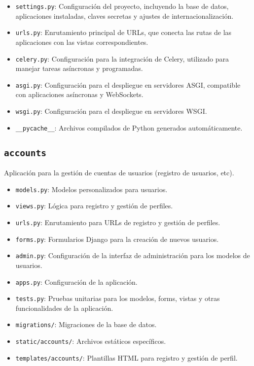\begin{itemize}
    \item \texttt{settings.py}: Configuración del proyecto, incluyendo la base de datos, aplicaciones instaladas, claves secretas y ajustes de internacionalización.
    \item \texttt{urls.py}: Enrutamiento principal de URLs, que conecta las rutas de las aplicaciones con las vistas correspondientes.
    \item \texttt{celery.py}: Configuración para la integración de Celery, utilizado para manejar tareas asíncronas y programadas.
    \item \texttt{asgi.py}: Configuración para el despliegue en servidores ASGI, compatible con aplicaciones asíncronas y WebSockets.
    \item \texttt{wsgi.py}: Configuración para el despliegue en servidores WSGI.
    \item \texttt{\_\_pycache\_\_}: Archivos compilados de Python generados automáticamente.
\end{itemize}

\subsection{\texttt{accounts}}
Aplicación para la gestión de cuentas de usuarios (registro de usuarios, etc).

\begin{itemize}
    \item \texttt{models.py}: Modelos personalizados para usuarios.
    \item \texttt{views.py}: Lógica para registro y gestión de perfiles.
    \item \texttt{urls.py}: Enrutamiento para URLs de registro y gestión de perfiles.
    \item \texttt{forms.py}: Formularios Django para la creación de nuevos usuarios.
    \item \texttt{admin.py}: Configuración de la interfaz de administración para los modelos de usuarios.
    \item \texttt{apps.py}: Configuración de la aplicación.
    \item \texttt{tests.py}: Pruebas unitarias para los modelos, forms, vistas y otras funcionalidades de la aplicación.
    \item \texttt{migrations/}: Migraciones de la base de datos.
    \item \texttt{static/accounts/}: Archivos estáticos específicos.
    \item \texttt{templates/accounts/}: Plantillas HTML para registro y gestión de perfil.
\end{itemize}

